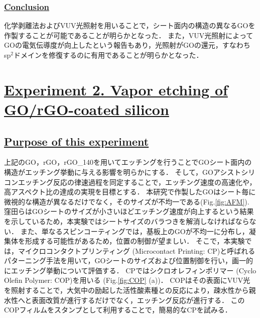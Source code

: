 \documentclass[platex,dvipdfmx]{jlreq}			%
\begin{document}
\subsubsection*{\ul{Conclusion}}
化学剥離法およびVUV光照射を用いることで，シート面内の構造の異なるGOを作製することが可能であることが明らかとなった．
また，VUV光照射によってGOの電気伝導度が向上したという報告もあり，光照射がGOの還元，すなわちsp$^2$ドメインを修復するのに有用であることが明らかとなった．

\newpage
\section*{\ul{Experiment 2. Vapor etching of GO/rGO-coated silicon}}

\subsection*{\ul{Purpose of this experiment}}
上記のGO，rGO，rGO\_140を用いてエッチングを行うことでGOシート面内の構造がエッチング挙動に与える影響を明らかにする．
そして，GOアシストシリコンエッチング反応の律速過程を同定することで，エッチング速度の高速化や，高アスペクト比の達成の実現を目標とする．
本研究で作製したGOはシート毎に微視的な構造が異なるだけでなく，そのサイズが不均一である(Fig.\ref{fig:AFM}).
窪田らはGOシートのサイズが小さいほどエッチング速度が向上するという結果を示しているため，本実験ではシートサイズのバラつきを解消しなければならない．
また、単なるスピンコーティングでは，基板上のGOが不均一に分布し，凝集体を形成する可能性があるため，位置の制御が望ましい．
そこで，本実験では，マイクロコンタクトプリンティング (Microcontact Printing: \textmu CP)と呼ばれるパターニング手法を用いて，GOシートのサイズおよび位置制御を行い，画一的にエッチング挙動について評価する．
\textmu CPではシクロオレフィンポリマー (Cyclo Olefin Polymer: COP)を用いる (Fig.\ref{fig:COP} (a))．
COPはその表面にVUV光を照射することで，大気中の励起した活性酸素種との反応により，疎水性から親水性へと表面改質が進行するだけでなく，エッチング反応が進行する．
このCOPフィルムをスタンプとして利用することで，簡易的な\textmu CPを試みる．
\end{document}
